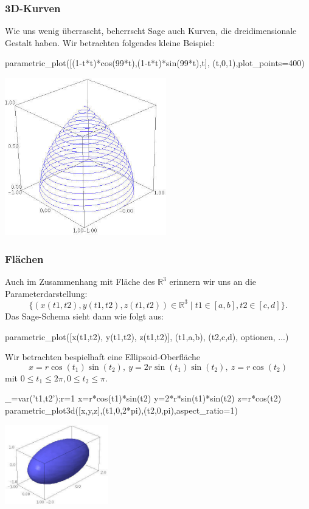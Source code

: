 \documentclass[fontsize=12pt,paper=a4,twoside,bibtotoc,idxtotoc,
liststotoc,pagesize,BCOR1.2cm,DIV15,chapterprefix,pagesize=pdftex]{scrbook}
\theoremstyle{plain}
\theoremstyle{definition}
\theoremstyle{remark}
\begin{document}
\subsubsection{3D-Kurven}
Wie uns wenig überrascht, beherrscht Sage auch Kurven, die dreidimensionale Gestalt haben. Wir betrachten folgendes kleine Beispiel:
\begin{sagein}
parametric_plot([(1-t*t)*cos(99*t),(1-t*t)*sin(99*t),t], (t,0,1),plot_points=400)
\end{sagein}
\begin{center}
\includegraphics[width=7cm]{parametric3d.jpg} 
\end{center}
\subsubsection{Flächen}
Auch im Zusammenhang mit Fläche des $\mathbb{R}^3$ erinnern wir uns an die Parameterdarstellung:
\[
 \{(x(t1,t2),y(t1,t2),z(t1,t2)) \in \mathbb{R}^3 \;|\; t1 \in [a,b], t2 \in [c,d] \}.
\]
Das Sage-Schema sieht dann wie folgt aus:
\begin{sagein}
parametric_plot([x(t1,t2), y(t1,t2), z(t1,t2)], (t1,a,b), (t2,c,d), optionen, ...)
\end{sagein}
Wir betrachten bespielhaft eine Ellipsoid-Oberfläche
\[ 
x=r \cos(t_1) \sin(t_2), \ y=2r \sin (t_1) \sin (t_2),\ z =r \cos(t_2) 
\]
 mit $0 \leq t_1 \leq 2 \pi, 0 \leq t_2 \leq \pi.$ 
\begin{sagein}
_=var('t1,t2');r=1
x=r*cos(t1)*sin(t2)
y=2*r*sin(t1)*sin(t2)
z=r*cos(t2)
parametric_plot3d([x,y,z],(t1,0,2*pi),(t2,0,pi),aspect_ratio=1)
\end{sagein}
\begin{center}
\includegraphics[width=4.5cm]{surface.jpg} 
\end{center}
\end{document}
